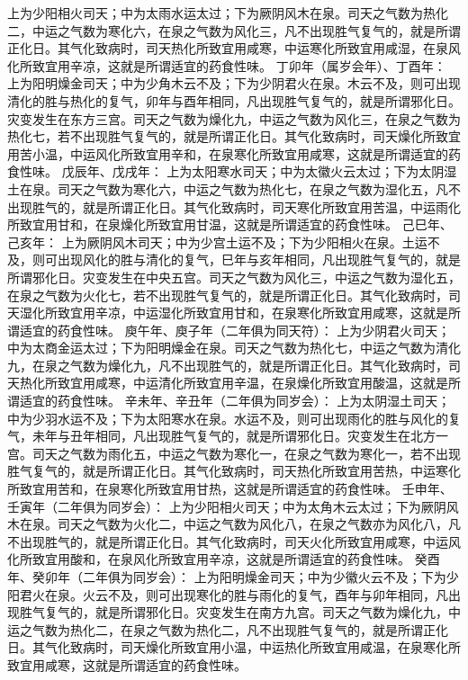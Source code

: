 \documentclass[12pt,UTF8]{ctexbook}
\begin{document}
上为少阳相火司天；中为太雨水运太过；下为厥阴风木在泉。司天之气数为热化二，中运之气数为寒化六，在泉之气数为风化三，凡不出现胜气复气的，就是所谓正化日。其气化致病时，司天热化所致宜用咸寒，中运寒化所致宜用咸湿，在泉风化所致宜用辛凉，这就是所谓适宜的药食性味。
丁卯年（属岁会年）、丁酉年：
上为阳明燥金司天；中为少角木云不及；下为少阴君火在泉。木云不及，则可出现清化的胜与热化的复气，卯年与酉年相同，凡出现胜气复气的，就是所谓邪化日。灾变发生在东方三宫。司天之气数为燥化九，中运之气数为风化三，在泉之气数为热化七，若不出现胜气复气的，就是所谓正化日。其气化致病时，司天燥化所致宜用苦小温，中运风化所致宜用辛和，在泉寒化所致宜用咸寒，这就是所谓适宜的药食性味。
戊辰年、戊戌年：
上为太阳寒水司天；中为太徽火云太过；下为太阴湿土在泉。司天之气数为寒化六，中运之气数为热化七，在泉之气数为湿化五，凡不出现胜气的，就是所谓正化日。其气化致病时，司天寒化所致宜用苦温，中运雨化所致宜用甘和，在泉燥化所致宜用甘温，这就是所谓适宜的药食性味。
己巳年、己亥年：
上为厥阴风木司天；中为少宫土运不及；下为少阳相火在泉。土运不及，则可出现风化的胜与清化的复气，巳年与亥年相同，凡出现胜气复气的，就是所谓邪化日。灾变发生在中央五宫。司天之气数为风化三，中运之气数为湿化五，在泉之气数为火化七，若不出现胜气复气的，就是所谓正化日。其气化致病时，司天湿化所致宜用辛凉，中运湿化所致宜用甘和，在泉寒化所致宜用咸寒，这就是所谓适宜的药食性味。
庾午年、庾子年（二年俱为同天符）：
上为少阴君火司天；中为太商金运太过；下为阳明燥金在泉。司天之气数为热化七，中运之气数为清化九，在泉之气数为燥化九，凡不出现胜气的，就是所谓正化日。其气化致病时，司天热化所致宜用咸寒，中运清化所致宜用辛温，在泉燥化所致宜用酸温，这就是所谓适宜的药食性味。
辛未年、辛丑年（二年俱为同岁会）：
上为太阴湿土司天；中为少羽水运不及；下为太阳寒水在泉。水运不及，则可出现雨化的胜与风化的复气，未年与丑年相同，凡出现胜气复气的，就是所谓邪化日。灾变发生在北方一宫。司天之气数为雨化五，中运之气数为寒化一，在泉之气数为寒化一，若不出现胜气复气的，就是所谓正化日。其气化致病时，司天热化所致宜用苦热，中运寒化所致宜用苦和，在泉寒化所致宜用甘热，这就是所谓适宜的药食性味。
壬申年、壬寅年（二年俱为同岁会）：
上为少阳相火司天；中为太角木云太过；下为厥阴风木在泉。司天之气数为火化二，中运之气数为风化八，在泉之气数亦为风化八，凡不出现胜气的，就是所谓正化日。其气化致病时，司天火化所致宜用咸寒，中运风化所致宜用酸和，在泉风化所致宜用辛凉，这就是所谓适宜的药食性味。
癸酉年、癸卯年（二年俱为同岁会）：
上为阳明燥金司天；中为少徽火云不及；下为少阳君火在泉。火云不及，则可出现寒化的胜与雨化的复气，酉年与卯年相同，凡出现胜气复气的，就是所谓邪化日。灾变发生在南方九宫。司天之气数为燥化九，中运之气数为热化二，在泉之气数为热化二，凡不出现胜气复气的，就是所谓正化日。其气化致病时，司天燥化所致宜用小温，中运热化所致宜用咸温，在泉寒化所致宜用咸寒，这就是所谓适宜的药食性味。
\end{document}

